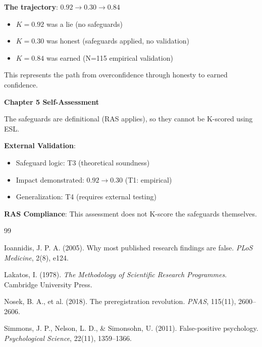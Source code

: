 \documentclass[11pt,a4paper]{article}
\theoremstyle{remark}
\begin{document}
\begin{keyinsight}[title={The Core Lesson of ESL 2.0}]
\textbf{The trajectory}: $0.92 \to 0.30 \to 0.84$

\begin{itemize}
    \item $K = 0.92$ was a lie (no safeguards)
    \item $K = 0.30$ was honest (safeguards applied, no validation)
    \item $K = 0.84$ was earned (N=115 empirical validation)
\end{itemize}

This represents the path from overconfidence through honesty to earned confidence.
\end{keyinsight}

\begin{eslbox}
\textbf{Chapter 5 Self-Assessment}

The safeguards are definitional (RAS applies), so they cannot be K-scored using ESL.

\textbf{External Validation}:
\begin{itemize}
    \item Safeguard logic: T3 (theoretical soundness)
    \item Impact demonstrated: $0.92 \to 0.30$ (T1: empirical)
    \item Generalization: T4 (requires external testing)
\end{itemize}

\textbf{RAS Compliance}: This assessment does not K-score the safeguards themselves.
\end{eslbox}


\newpage


\begin{thebibliography}{99}

Ioannidis, J. P. A. (2005).
Why most published research findings are false.
\textit{PLoS Medicine}, 2(8), e124.

Lakatos, I. (1978).
\textit{The Methodology of Scientific Research Programmes}.
Cambridge University Press.

Nosek, B. A., et al. (2018).
The preregistration revolution.
\textit{PNAS}, 115(11), 2600--2606.

Simmons, J. P., Nelson, L. D., \& Simonsohn, U. (2011).
False-positive psychology.
\textit{Psychological Science}, 22(11), 1359--1366.

\end{thebibliography}
\end{document}
